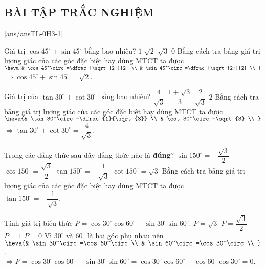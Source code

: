 \subsection{BÀI TẬP TRẮC NGHIỆM}
[ans/ansTL-0H3-1]
\setcounter{ex}{0}
\begin{ex}%
	Giá trị $\cos 45^\circ+\sin 45^\circ$ bằng bao nhiêu?
	\choice
	{$1$}
	{\True $\sqrt{2}$}
	{$\sqrt{3}$}
	{$0$}
	\loigiai
	{Bằng cách tra bảng giá trị lượng giác của các góc đặc biệt hay dùng MTCT ta được $\heva{& \cos 45^\circ=\dfrac{\sqrt{2}}{2} \\ 
			& \sin 45^\circ=\dfrac{\sqrt{2}}{2} \\ 
		}$\\
		$\Rightarrow \cos 45^\circ+\sin 45^\circ=\sqrt{2}$.}
\end{ex}
\begin{ex}%
	Giá trị của $\tan 30^\circ+\cot 30^\circ$ bằng bao nhiêu?
	\choice
	{\True $\dfrac{4}{\sqrt{3}}$}
	{$\dfrac{1+\sqrt{3}}{3}$}
	{$\dfrac{2}{\sqrt{3}}$}
	{$2$}
	\loigiai
	{Bằng cách tra bảng giá trị lượng giác của các góc đặc biệt hay dùng MTCT ta được $\heva{& \tan 30^\circ=\dfrac{1}{\sqrt{3}} \\ 
			& \cot 30^\circ=\sqrt{3} \\ 
		}$\\
		$\Rightarrow\tan 30^\circ+\cot 30^\circ=\dfrac{4}{\sqrt{3}}$.}
\end{ex}
\begin{ex}%
	Trong các đẳng thức sau đây đẳng thức nào là \textbf{đúng}?
	\choice
	{$\sin {150^\circ}=-\dfrac{\sqrt{3}}{2}$}
	{$\cos {150^\circ}=\dfrac{\sqrt{3}}{2}$}
	{\True $\tan {150^\circ}=-\dfrac{1}{\sqrt{3}}$}
	{$\cot {150^\circ}=\sqrt{3}$}
	\loigiai
	{Bằng cách tra bảng giá trị lượng giác của các góc đặc biệt hay dùng MTCT ta được\\
		$\tan {150^\circ}=-\dfrac{1}{\sqrt{3}}$.}
\end{ex}
\begin{ex}%
	Tính giá trị biểu thức $P=\cos 30^\circ\cos 60^\circ-\sin 30^\circ\sin 60^\circ$.
	\choice
	{$P=\sqrt{3}$}
	{$P=\dfrac{\sqrt{3}}{2}$}
	{$P=1$}
	{\True $P=0$}
	\loigiai
	{Vì $30^\circ$ và $60^\circ$ là hai góc phụ nhau nên $\heva{& \sin 30^\circ=\cos 60^\circ \\ 
			& \sin 60^\circ=\cos 30^\circ \\ 
		}$.\\
		$\Rightarrow P=\cos 30^\circ\cos 60^\circ-\sin 30^\circ\sin 60^\circ=\cos 30^\circ\cos 60^\circ-\cos 60^\circ\cos 30^\circ=0$.}
\end{ex}

